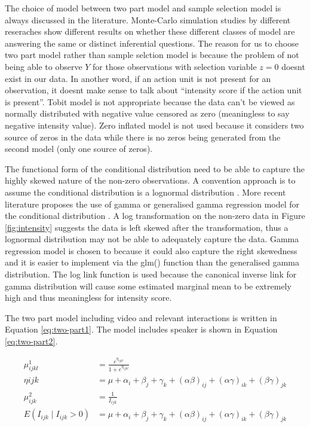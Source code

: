 \documentclass{monashthesis}
\begin{document}
The choice of model between two part model and sample selection model is always discussed in the literature. Monte-Carlo simulation studies by different reseraches \autocites{leung1996choice}{duan1984choosing}{manning1987monte} show different results on whether these different classes of model are answering the same or distinct inferential questions. The reason for us to choose two part model rather than sample selction model is because the problem of not being able to observe \(Y\) for those observations with selection variable \(z = 0\) doesnt exist in our data. In another word, if an action unit is not present for an observation, it doesnt make sense to talk about ``intensity score if the action unit is present''. Tobit model is not appropriate because the data can't be viewed as normally distributed with negative value censored as zero (meaningless to say negative intensity value). Zero inflated model is not used because it considers two source of zeros in the data while there is no zeros being generated from the second model (only one source of zeros).

The functional form of the conditional distribution need to be able to capture the highly skewed nature of the non-zero observations. A convention approach is to assume the conditional distribution is a lognormal distribution \autocites{manning1981two}{diehr1999methods}. More recent literature proposes the use of gamma or generalised gamma regression model for the conditional distribution \autocite{twopart2010}. A log transformation on the non-zero data in Figure \ref{fig:intensity} suggests the data is left skewed after the transformation, thus a lognormal distribution may not be able to adequately capture the data. Gamma regression model is chosen to because it could also capture the right skewedness and it is easier to implement via the glm() function than the generalised gamma distribution. The log link function is used because the canonical inverse link for gamma distribution will cause some estimated marginal mean to be extremely high and thus meaningless for intensity score.

The two part model including video and relevant interactions is written in Equation \ref{eq:two-part1}. The model includes speaker is shown in Equation \ref{eq:two-part2}.

\begin{align}\label{eq:two-part1}
\mu_{ijkl}^1 &= \frac{e^{\eta_{ijkl}}}{1 + e^{\eta_{ijkl}}} \\
\eta{ijk} &= \mu + \alpha_i + \beta_j +\gamma_k + (\alpha\beta)_{ij} + (\alpha\gamma)_{ik} + (\beta\gamma)_{jk} \\
\mu_{ijk}^2 &= \frac{1}{I_{ijk}} \\
E(I_{ijk} \mid I_{ijk} > 0) &= \mu + \alpha_i + \beta_j +\gamma_k + (\alpha\beta)_{ij} + (\alpha\gamma)_{ik} + (\beta\gamma)_{jk}
\end{align}
\end{document}

